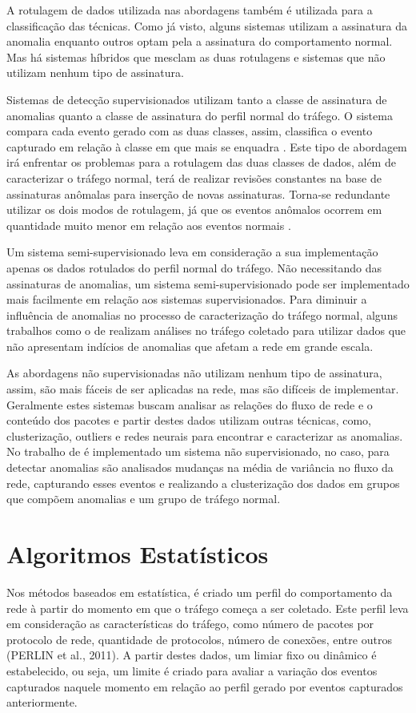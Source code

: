 \indent A rotulagem de dados utilizada nas abordagens também é utilizada para a classificação das técnicas. Como já visto, alguns sistemas utilizam a assinatura da anomalia enquanto outros optam pela a assinatura do comportamento normal. Mas há sistemas híbridos que mesclam as duas rotulagens e sistemas que não utilizam nenhum tipo de assinatura.

\indent Sistemas de detecção supervisionados utilizam tanto a classe de assinatura de anomalias quanto a classe de assinatura do perfil normal do tráfego. O sistema compara cada evento gerado com as duas classes, assim, classifica o evento capturado em relação à classe em que mais se enquadra \cite{chandola2009}. Este tipo de abordagem irá enfrentar os problemas para a rotulagem das duas classes de dados, além de caracterizar o tráfego normal, terá de realizar revisões constantes na base de assinaturas anômalas para inserção de novas assinaturas. Torna-se redundante utilizar os dois modos de rotulagem, já que os eventos anômalos ocorrem em quantidade muito menor em relação aos eventos normais \cite{Bhuyan}.

\indent Um sistema semi-supervisionado leva em consideração a sua implementação apenas os dados rotulados do perfil normal do tráfego. Não necessitando das assinaturas de anomalias, um sistema semi-supervisionado pode ser implementado mais facilmente em relação aos sistemas supervisionados. Para diminuir a influência de anomalias no processo de caracterização do tráfego normal, alguns trabalhos como o de  realizam análises no tráfego coletado para utilizar dados que não apresentam indícios de anomalias que afetam a rede em grande escala.

\indent As abordagens não supervisionadas não utilizam nenhum tipo de assinatura, assim, são mais fáceis de ser aplicadas na rede, mas são difíceis de implementar. Geralmente estes sistemas buscam analisar as relações do fluxo de rede e o conteúdo dos pacotes e partir destes dados utilizam outras técnicas, como, clusterização, outliers e redes neurais para encontrar e caracterizar as anomalias. No trabalho de  é implementado um sistema não supervisionado, no caso, para detectar anomalias são analisados mudanças na média de variância no fluxo da rede, capturando esses eventos e realizando a clusterização dos dados em grupos que compõem anomalias e um grupo de tráfego normal.


  \section{Algoritmos Estatísticos}
\indent Nos métodos baseados em estatística, é criado um perfil do comportamento da rede à partir do momento em que o tráfego começa a ser coletado. Este perfil leva em consideração as características do tráfego, como número de pacotes por protocolo de rede, quantidade de protocolos, número de conexões, entre outros (PERLIN et al., 2011). A partir destes dados, um limiar fixo ou dinâmico é estabelecido, ou seja, um limite é criado para avaliar a variação dos eventos capturados naquele momento em relação ao perfil gerado por eventos capturados anteriormente.

